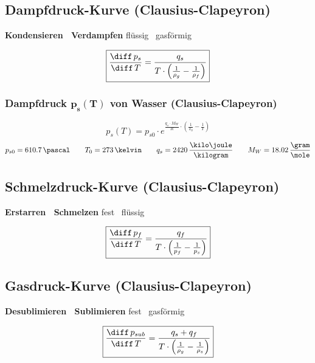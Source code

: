 \subsection{Dampfdruck-Kurve (Clausius-Clapeyron)}

\textbf{Kondensieren \textlrarrow\ Verdampfen}  \qquad flüssig \textlrarrow\ gasförmig

$$ \boxed{ \frac{\diff \, p_s}{\diff \, T} = \frac{q_s}{T \cdot  \Big( \frac{1}{\rho_g} - \frac{1}{\rho_f} \Big) } } $$


\subsubsection{Dampfdruck $\boldsymbol{p_s(T)}$ von Wasser (Clausius-Clapeyron)}

\vspace{-0.2cm}

$$ \boxed{ p_s(T) = p_{s0} \cdot e^{\frac{q_s \cdot M_W}{R} \cdot \left( \frac{1}{T_0} - \frac{1}{T} \right) }} $$
$$ p_{s0} = 610.7 \, \pascal \qquad T_0 = 273 \, \kelvin \qquad q_s = 2420 \, \frac{\kilo \joule}{\kilogram} \qquad M_W = 18.02 \, \frac{\gram}{\mole} $$

\subsection{Schmelzdruck-Kurve (Clausius-Clapeyron)}

\textbf{Erstarren \textlrarrow\ Schmelzen}  \qquad fest \textlrarrow\ flüssig

$$ \boxed{ \frac{\diff \, p_f}{\diff \, T} = \frac{q_f}{T \cdot \Big( \frac{1}{p_f} - \frac{1}{p_s} \Big) } } $$


\subsection{Gasdruck-Kurve (Clausius-Clapeyron)}

\textbf{Desublimieren \textlrarrow\ Sublimieren} \qquad fest \textleftarrow\ gasförmig

$$ \boxed{ \frac{\diff \, p_{sub}}{\diff \, T} = \frac{q_s + q_f}{T \cdot \Big( \frac{1}{\rho_g} - \frac{1}{\rho_s} \Big) } } $$


